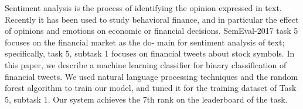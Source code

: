 Sentiment analysis is the process of identifying the opinion expressed in text. Recently it has been used to study behavioral finance, and in particular the effect of opinions and emotions on economic or financial decisions. SemEval-2017 task 5 focuses on the financial market as the do- main for sentiment analysis of text; specifically, task 5, subtask 1 focuses on financial tweets about stock symbols. In this paper, we describe a machine learning classifier for binary classification of financial tweets. We used natural language processing techniques and the random forest algorithm to train our model, and tuned it for the training dataset of Task 5, subtask 1. Our system achieves the 7th rank on the leaderboard of the task.
